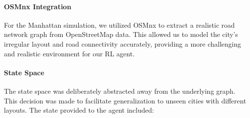 \documentclass[11pt]{article}
\begin{document}
\paragraph{OSMnx Integration} For the Manhattan simulation, we utilized OSMnx to extract a realistic road network
graph from OpenStreetMap data. This allowed us to model the city's irregular layout and road connectivity
accurately, providing a more challenging and realistic environment for our RL agent.

\paragraph{State Space} The state space was deliberately abstracted away from the underlying graph. This
decision was made to facilitate generalization to unseen cities with different layouts. The state provided to
the agent included:
\end{document}
